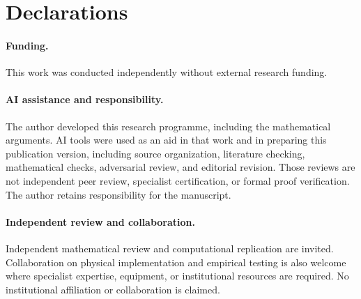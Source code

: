 \documentclass[11pt]{article}
\theoremstyle{definition}\newtheorem{assumption}[theorem]{Constitutive assumption}
\theoremstyle{remark}\newtheorem{remark}[theorem]{Remark}
\begin{document}
\section*{Declarations}
\paragraph{Funding.} This work was conducted independently without external research funding.

\paragraph{AI assistance and responsibility.} The author developed this research programme, including the mathematical arguments. AI tools were used as an aid in that work and in preparing this publication version, including source organization, literature checking, mathematical checks, adversarial review, and editorial revision. Those reviews are not independent peer review, specialist certification, or formal proof verification. The author retains responsibility for the manuscript.

\paragraph{Independent review and collaboration.} Independent mathematical review and computational replication are invited. Collaboration on physical implementation and empirical testing is also welcome where specialist expertise, equipment, or institutional resources are required. No institutional affiliation or collaboration is claimed.
\end{document}
